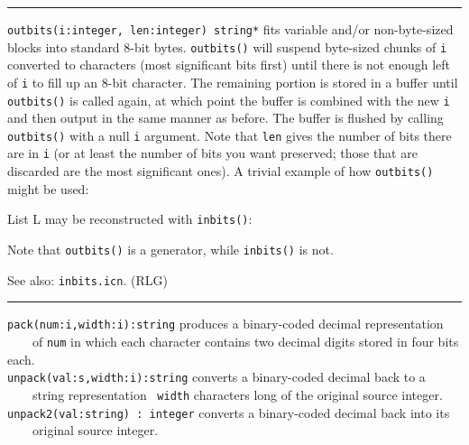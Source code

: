 \vspace{0.25cm}\hrule{}

\texttt{outbits(i:integer, len:integer) string*} fits variable and/or
non-byte-sized blocks into standard 8-bit bytes. \texttt{outbits()}
will suspend byte-sized chunks of \texttt{i} converted to characters
(most significant bits first) until there is not enough left of
\texttt{i} to fill up an 8-bit character. The remaining portion is
stored in a buffer until \texttt{outbits()} is called again, at which
point the buffer is combined with the new \texttt{i} and then output in
the same manner as before. The buffer is flushed by calling
\texttt{outbits()} with a null \texttt{i} argument. Note that
\texttt{len} gives the number of bits there are in \texttt{i} (or at
least the number of bits you want preserved; those that are discarded
are the most significant ones). A trivial example of how
\texttt{outbits()} might be used:


List L may be reconstructed with \texttt{inbits()}:


Note that \texttt{outbits()} is a generator, while
\texttt{inbits()} is not.

See also: \texttt{inbits.icn}. (RLG)

\vspace{0.25cm}\hrule{}

\texttt{pack(num:i,width:i):string} produces a binary-coded decimal
representation\\
 \ \ \ \ of \texttt{num} in which each character contains two decimal
digits stored in four bits each.\\
\texttt{unpack(val:s,width:i):string} converts a binary-coded decimal
back to a\\
 \ \ \ \ string representation \ \texttt{width} characters long of the
original source integer.\\
\texttt{unpack2(val:string) : integer} converts a binary-coded decimal
back into its\\
 \ \ \ \ original source integer.

